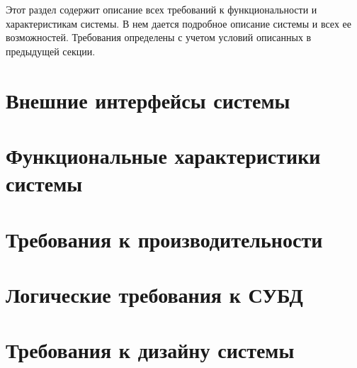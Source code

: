 Этот раздел содержит описание всех требований к функциональности и характеристикам системы. 
В нем дается подробное описание системы и всех ее возможностей. Требования определены с учетом условий описанных в предыдущей секции.

\section{Внешние интерфейсы системы}


\section{Функциональные характеристики системы}


\section{Требования к производительности}


\section{Логические требования к СУБД}


\section{Требования к дизайну системы}


% 


% 
